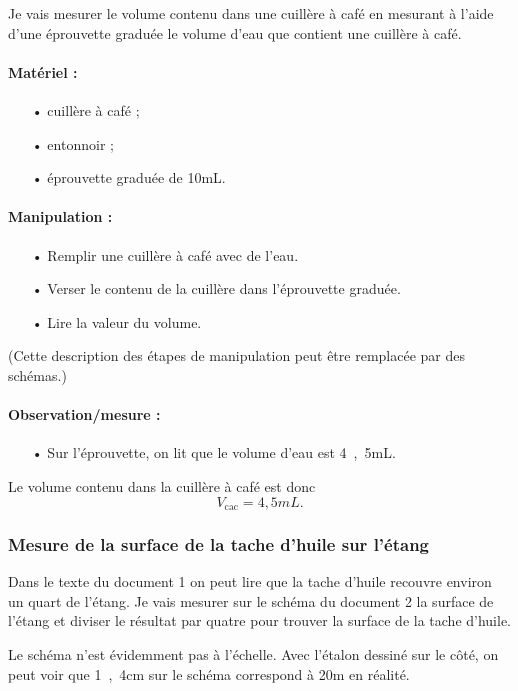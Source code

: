 \documentclass[12pt,a4paper]{article}
\begin{document}
Je vais mesurer le volume contenu dans une cuillère à café en mesurant à l'aide d'une éprouvette graduée le volume d'eau que contient une cuillère à café.

\paragraph{Matériel :}
\begin{itemize}
\item[•] cuillère à café ;
\item[•] entonnoir ;
\item[•] éprouvette graduée de \unit{10}{mL}.
\end{itemize}

\paragraph{Manipulation :}
\begin{itemize}
\item[•] Remplir une cuillère à café avec de l'eau.
\item[•] Verser le contenu de la cuillère dans l'éprouvette graduée.
\item[•] Lire la valeur du volume.
\end{itemize}
(Cette description des étapes de manipulation peut être remplacée par des schémas.)

\paragraph{Observation/mesure :}
\begin{itemize}
\item[•] Sur l'éprouvette, on lit que le volume d'eau est \unit{4{,}5}{mL}.
\end{itemize}

Le volume contenu dans la cuillère à café est donc 
\[
V_\mathrm{cac} =  \unit{4{,}5}{mL}.
\]

\subsubsection{Mesure de la surface de la tache d'huile sur l'étang}

Dans le texte du document 1 on peut lire que la tache d'huile recouvre environ un quart de l'étang.
Je vais mesurer sur le schéma du document 2 la surface de l'étang et diviser le résultat par quatre pour trouver la surface de la tache d'huile.

Le schéma n'est évidemment pas à l'échelle.
Avec l'étalon dessiné sur le côté, on peut voir que \unit{1{,}4}{cm} sur le schéma correspond à \unit{20}{m} en réalité.
\end{document}
